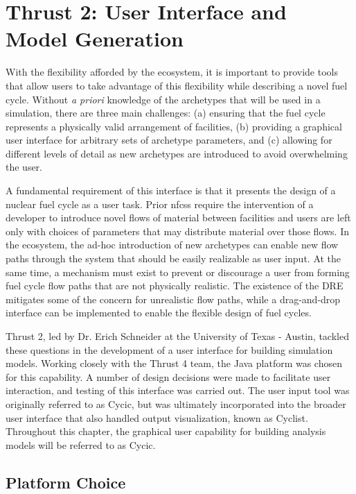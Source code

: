 \chapter{Thrust 2: User Interface and Model Generation}\label{chap:thrust2}

With the flexibility afforded by the \Cyclus ecosystem, it is important to
provide tools that allow users to take advantage of this flexibility while
describing a novel fuel cycle.  Without \emph{a priori} knowledge of the
archetypes that will be used in a simulation, there are three main challenges:
(a) ensuring that the fuel cycle represents a physically valid arrangement of
facilities, (b) providing a graphical user interface for arbitrary sets of
archetype parameters, and (c) allowing for different levels of detail as new
archetypes are introduced to avoid overwhelming the user.

A fundamental requirement of this interface is that it presents the design of
a nuclear fuel cycle as a user task.  Prior \glspl{nfcs} require the
intervention of a developer to introduce novel flows of material between
facilities and users are left only with choices of parameters that may
distribute material over those flows.  In the \Cyclus ecosystem, the ad-hoc
introduction of new archetypes can enable new flow paths through the system
that should be easily realizable as user input.  At the same time, a mechanism
must exist to prevent or discourage a user from forming fuel cycle flow paths
that are not physically realistic.  The existence of the \gls{DRE} mitigates
some of the concern for unrealistic flow paths, while a drag-and-drop
interface can be implemented to enable the flexible design of fuel cycles.

Thrust 2, led by Dr. Erich Schneider at the University of Texas - Austin,
tackled these questions in the development of a user interface for building
simulation models.  Working closely with the Thrust 4 team, the Java platform
was chosen for this capability.  A number of design decisions were made to
facilitate user interaction, and testing of this interface was carried out.
The user input tool was originally referred to as Cycic, but was ultimately
incorporated into the broader user interface that also handled output
visualization, known as Cyclist.  Throughout this chapter, the graphical user
capability for building analysis models will be referred to as Cycic.

\section{Platform Choice}

